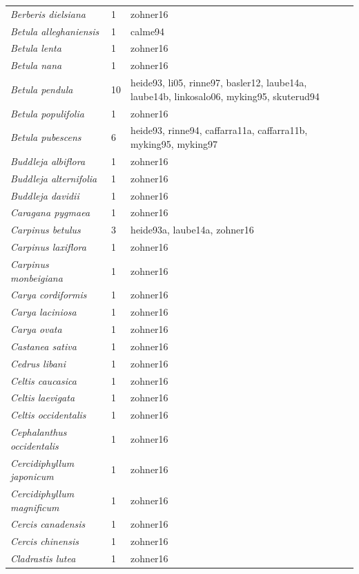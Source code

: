 \documentclass{article}
\begin{document}
\begin{footnotesize}
\begin{longtable}{p{}p{}p{}}
  \textit{Berberis dielsiana} &   1 & zohner16 \\ 
  \textit{Betula alleghaniensis} &   1 & calme94 \\ 
  \textit{Betula lenta} &   1 & zohner16 \\ 
  \textit{Betula nana} &   1 & zohner16 \\ 
  \textit{Betula pendula} &  10 & heide93, li05, rinne97, basler12, laube14a, laube14b, linkosalo06, myking95, skuterud94 \\ 
  \textit{Betula populifolia} &   1 & zohner16 \\ 
  \textit{Betula pubescens} &   6 & heide93, rinne94, caffarra11a, caffarra11b, myking95, myking97 \\ 
  \textit{Buddleja albiflora} &   1 & zohner16 \\ 
  \textit{Buddleja alternifolia} &   1 & zohner16 \\ 
  \textit{Buddleja davidii} &   1 & zohner16 \\ 
  \textit{Caragana pygmaea} &   1 & zohner16 \\ 
  \textit{Carpinus betulus} &   3 & heide93a, laube14a, zohner16 \\ 
  \textit{Carpinus laxiflora} &   1 & zohner16 \\ 
  \textit{Carpinus monbeigiana} &   1 & zohner16 \\ 
  \textit{Carya cordiformis} &   1 & zohner16 \\ 
  \textit{Carya laciniosa} &   1 & zohner16 \\ 
  \textit{Carya ovata} &   1 & zohner16 \\ 
  \textit{Castanea sativa} &   1 & zohner16 \\ 
  \textit{Cedrus libani} &   1 & zohner16 \\ 
  \textit{Celtis caucasica} &   1 & zohner16 \\ 
  \textit{Celtis laevigata} &   1 & zohner16 \\ 
  \textit{Celtis occidentalis} &   1 & zohner16 \\ 
  \textit{Cephalanthus occidentalis} &   1 & zohner16 \\ 
  \textit{Cercidiphyllum japonicum} &   1 & zohner16 \\ 
  \textit{Cercidiphyllum magnificum} &   1 & zohner16 \\ 
  \textit{Cercis canadensis} &   1 & zohner16 \\ 
  \textit{Cercis chinensis} &   1 & zohner16 \\ 
  \textit{Cladrastis lutea} &   1 & zohner16 \\ 

\end{longtable}
\end{footnotesize}
\end{document}
